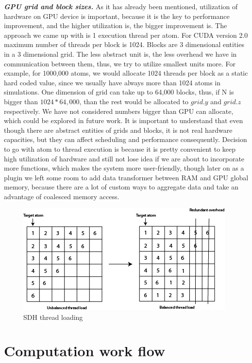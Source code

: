 \documentclass[12pt,letterpaper]{report}
\begin{document}
\emph{\textbf{GPU grid and block sizes.}} As it has already been mentioned, utilization of hardware on GPU device is important, because it is the key to performance improvement, and the higher utilization is, the bigger improvement is.
The approach we came up with is 1 execution thread per atom. For CUDA version 2.0 maximum number of threads per block is 1024. Blocks are 3 dimensional entities in a 3 dimensional grid. The less abstract unit is, the less overhead we have in communication between them, thus, we try to utilize smallest units more. For example, for 1000,000 atoms, we would allocate 1024 threads per block as a static hard coded value, since we usually have always more than 1024 atoms in simulations. One dimension of grid can take up to 64,000 blocks, thus, if N is bigger than $1024 * 64,000$, than the rest would be allocated to $grid.y$ and $grid.z$ respectively. We have not considered numbers bigger than GPU can allocate, which could be explored in future work. It is important to understand that even though there are abstract entities of grids and blocks, it is not real hardware capacities, but they can affect scheduling and performance consequently. Decision to go with atom to thread execution is because it is pretty convenient to keep high utilization of hardware and still not lose idea if we are about to incorporate more functions, which makes the system more user-friendly, though later on as a plugin we left some room to add data transformer between RAM and GPU global memory, because there are a lot of custom ways to aggregate data and take an advantage of coalesced memory access.

\begin{figure}
 \centerline{ \includegraphics[width=0.5\columnwidth]{images/threadload} }
 \caption{SDH thread loading}
 \label{fg:threadload}
\end{figure}



\section{Computation work flow}
\end{document}
